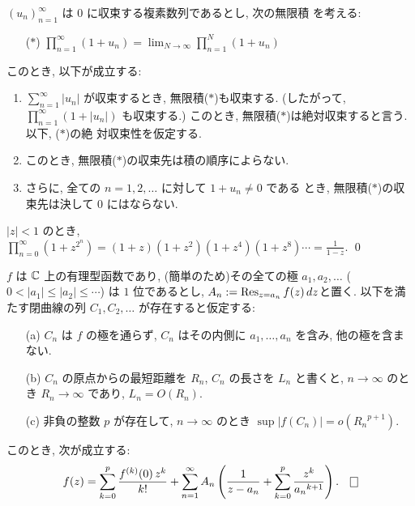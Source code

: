 \documentclass[12pt,twoside]{jarticle}
\begin{document}
\begin{question}[無限乗積の絶対収束]
  $(u_n)_{n=1}^\infty$ は $0$ に収束する複素数列であるとし, 次の無限積
  を考える:
  \begin{itemize}
  \item[($\ast$)]
    \hfil
    \(\displaystyle
      \prod_{n=1}^\infty (1 + u_n) 
      =
      \lim_{N\to\infty} \prod_{n=1}^N (1 + u_n) 
    \)%
    \hfil
  \end{itemize}
  このとき, 以下が成立する:
  \begin{enumerate}
  \item \(\displaystyle \sum_{n=1}^\infty |u_n| \) が収束するとき, 
    無限積($\ast$)も収束する. %
    (したがって, %
    \(\displaystyle \prod_{n=1}^\infty (1 + |u_n|) \) も収束する.)
    このとき, 無限積($\ast$)は絶対収束すると言う. 以下, ($\ast$)の絶
    対収束性を仮定する. 
  \item このとき, 無限積($\ast$)の収束先は積の順序によらない. 
  \item さらに, 全ての $n = 1,2,\dots$ に対して $1 + u_n \ne 0$ である
    とき, 無限積($\ast$)の収束先は決して $0$ にはならない.
  \end{enumerate}
\end{question}

\begin{question}
  $|z|<1$ のとき, 
  \(\displaystyle
    \prod_{n=0}^\infty (1 + z^{2^n}) 
    =
    (1 + z)(1 + z^2)(1 + z^4)(1 + z^8) \cdots
    =
    \frac{1}{1 - z}.
  \)
  \qed
\end{question}

\begin{question}[有理型函数の部分分数展開]\label{q:bubun-bunsu-tenkai}
  $f$ は ${\mathbb C}$ 上の有理型函数であり, %
  (簡単のため)その全ての極 $a_1, a_2, \dots$ %
  ($0 < |a_1| \le |a_2| \le \cdots$) は $1$ 位であるとし, %
  $\displaystyle A_n := \mathop{\mathrm{Res}}\nolimits_{z=a_n}f(z)\,dz$と置く.  %
  以下を満たす閉曲線の列 $C_1, C_2, \dots$ が存在すると仮定する:
  \begin{itemize}
  \item[(a)] $C_n$ は $f$ の極を通らず, $C_n$ はその内側に 
    $a_1,\dots,a_n$ を含み, 他の極を含まない.
  \item[(b)] $C_n$ の原点からの最短距離を $R_n$, $C_n$ の長さを $L_n$
    と書くと, $n\to\infty$ のとき $R_n\to\infty$ であり, $L_n=O(R_n)$.
  \item[(c)] 非負の整数 $p$ が存在して, $n\to\infty$ のとき 
    $\sup|f(C_n)| = o({R_n}^{p+1})$.
  \end{itemize}
  このとき, 次が成立する:
  \[
    f(z) = 
    \sum_{k=0}^{p} \frac{f^{(k)}(0)\,z^k}{k!}
    + \sum_{n=1}^\infty A_n
      \left( \frac{1}{z - a_n} 
           + \sum_{k=0}^p\frac{z^k}{{a_n}^{k+1}} \right).
    \qed
  \]
\end{question}
\end{document}
